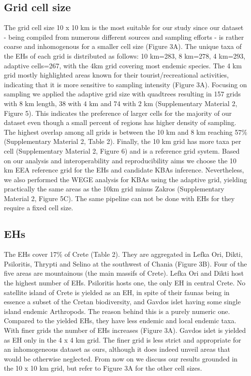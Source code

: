     \subsection{Grid cell size}
    \label{subsec:arthropods-grids}
The grid cell size 10 x 10 km is the most suitable for our study since our
dataset - being compiled from numerous different sources and sampling efforts -
is rather coarse and inhomogenous for a smaller cell size (Figure 3A).
The unique taxa of the EHs of each grid is distributed as follows: 10 km=283,
8 km=278, 4 km=293, adaptive cells=267, with the 4km grid covering most endemic
species. The 4 km grid mostly highlighted areas known for their tourist/recreational activities,
indicating that it is more sensitive to sampling intensity (Figure 3A).
Focusing on sampling we applied the adaptive grid size with quadtrees resulting
in 157 grids with 8 km length, 38 with 4 km and 74 with 2 km (Supplementary Material 2, Figure 5).
This indicates the preference of larger cells for the majority of our dataset
even though a small percent of regions has higher density of sampling.
The highest overlap among all grids is between the 10 km and 8 km reaching
57\% (Supplementary Material 2, Table 2). Finally, the 10 km grid has more taxa
per cell (Supplementary Material 2, Figure 6) and is a reference grid system.
Based on our analysis and interoperability and reproducibility aims we choose
the 10 km EEA reference grid for the EHs and candidate KBAs inference.
Nevertheless, we also performed the WEGE analysis for KBAs using the adaptive
grid, yielding practically the same areas as the 10km grid minus Zakros (Supplementary Material 2, Figure 5C).
The same pipeline can not be done with EHs for they require a fixed cell size.

    \subsection{EHs}
    \label{subsec:EHs}

The EHs cover 17\% of Crete (Table 2). They are aggregated in Lefka Ori, Dikti,
Psiloritis, Thrypti and Selino at the southwest of Chania (Figure 3B).
Four of the five areas are mountainous (the main massifs of Crete). Lefka Ori
and Dikti host the highest number of EHs. Psiloritis hosts one, the only EH in
central Crete. No satellite island of Crete is yielded as an EH, in spite of
their faunas being in essence a subset of the Cretan biodiversity, and Gavdos
islet having some single island endemic Arthropods. The reason behind this is a
purely numeric one. Compared to the yielded EHs, they have less endemic and local
endemic taxa. With finer grids the number of EHs increases (Figure 3A). Gavdos
islet is yielded as EH only in the 4 x 4 km grid. The finer grid is less strict
and appropriate for an inhomogeneous dataset as ours, although it does indeed
unveil areas that would be otherwise neglected. From now on we discuss our
results grounded in the 10 x 10 km grid, but refer to Figure 3A for the other
cell sizes.

